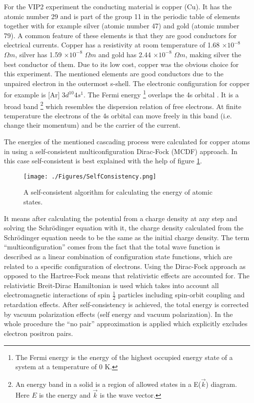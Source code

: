 For the VIP2 experiment the conducting material is copper (Cu). It has the atomic number 29 and is part of the group 11 in the periodic table of elements together with for example silver (atomic number 47) and gold (atomic number 79). A common feature of these elements is that they are good conductors for electrical currents. Copper has a resistivity at room temperature of 1.68 $\times 10^{-8}$ $\Omega m $, silver has 1.59 $\times 10^{-8}$ $\Omega m $ and gold has 2.44 $\times 10^{-8}$ $\Omega m $, making silver the best conductor of them. Due to its low cost, copper was the obvious choice for this experiment. The mentioned elements are good conductors due to the unpaired electron in the outermost s-shell. The electronic configuration for copper for example is [Ar] $3d^{10}4s^{1}$. The Fermi energy \footnote{The Fermi energy is the energy of the highest occupied energy state of a system at a temperature of 0 K.} overlaps the 4s orbital \cite{Hilscher2009}. It is a broad band \footnote{An energy band in a solid is a region of allowed states in a E($\vec{k}$) diagram. Here $E$ is the energy and $\vec{k}$ is the wave vector.} which resembles the dispersion relation of free electrons. At finite temperature the electrons of the 4s orbital can move freely in this band (i.e. change their momentum) and be the carrier of the current. 

The energies of the mentioned cascading process were calculated for copper atoms in \cite{DiMatteo2005} using a self-consistent multiconfiguration Dirac-Fock (MCDF) approach. In this case self-consistent is best explained with the help of figure \ref{fig:SelfCons}.
\begin{figure}[h]
 \centering
 \texttt{[image: ./Figures/SelfConsistency.png]}
 \caption{A self-consistent algorithm for calculating the energy of atomic states.}
 \label{fig:SelfCons}
\end{figure}
It means after calculating the potential from a charge density at any step and solving the Schrödinger equation with it, the charge density calculated from the Schrödinger equation needs to be the same as the initial charge density. The term ``multiconfiguration'' comes from the fact that the total wave function is described as a linear combination of configuration state functions, which are related to a specific configuration of electrons. Using the Dirac-Fock approach as opposed to the Hartree-Fock means that relativistic effects are accounted for. The relativistic Breit-Dirac Hamiltonian is used which takes into account all electromagnetic interactions of spin $\frac{1}{2}$ particles including spin-orbit coupling and retardation effects. After self-consistency is achieved, the total energy is corrected by vacuum polarization effects (self energy and vacuum polarization). In the whole procedure the ``no pair'' approximation is applied which explicitly excludes electron positron pairs.

